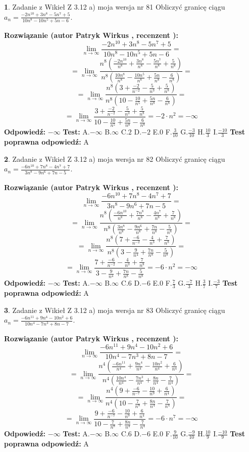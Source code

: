 \documentclass[12pt, a4paper]{article}
\theoremstyle{definition} %
\newtheorem{zad}{}
\newcommand{\zadStart}[1]{\begin{zad}#1\newline}
\newcommand{\zadStop}{\end{zad}}
\newcommand{\rozwStart}[2]{\noindent \textbf{Rozwiązanie (autor #1 , recenzent #2): }\newline}
\newcommand{\rozwStop}{\newline}
\newcommand{\odpStart}{\noindent \textbf{Odpowiedź:}\newline}
\newcommand{\odpStop}{\newline}
\newcommand{\testStart}{\noindent \textbf{Test:}\newline}
\newcommand{\testStop}{\newline}
\newcommand{\kluczStart}{\noindent \textbf{Test poprawna odpowiedź:}\newline}
\newcommand{\kluczStop}{\newline}
\begin{document}
\zadStart{Zadanie z Wikieł Z 3.12 a) moja wersja nr 81}
Obliczyć granicę ciągu $a_{n}=\frac{-2n^{10}+3n^{8}-5n^{7}+5}{10n^{8}-10n^{5}+5n-6}$.
\zadStop
\rozwStart{Patryk Wirkus}{}
$$\lim\limits_{n\to\infty}\frac{-2n^{10}+3n^{8}-5n^{7}+5}{10n^{8}-10n^{5}+5n-6}=$$
$$=\lim\limits_{n\to\infty}\frac{n^{8}\left(\frac{-2n^{10}}{n^{8}}+\frac{3n^{8}}{n^{8}}-\frac{5n^{7}}{n^{8}}+\frac{5}{n^{8}}\right)}{n^{8}\left(\frac{10n^{8}}{n^{8}}-\frac{10n^{5}}{n^{8}}+\frac{5n}{n^{8}}-\frac{6}{n^{8}}\right)}=$$
$$=\lim\limits_{n\to\infty}\frac{n^{8}\left(3+\frac{-2}{n^{-2}}-\frac{5}{n^{3}}+\frac{5}{n^{8}}\right)}
{n^{8}\left(10-\frac{10}{n^{5}}+\frac{5n}{n^{8}}-\frac{6}{n^{8}}\right)}=$$
$$=\lim\limits_{n\to\infty}\frac{3+\frac{-2}{n^{-2}}-\frac{5}{n^{3}}+\frac{5}{n^{8}}}{10-\frac{10}{n^{5}}+\frac{5n}{n^{8}}-\frac{6}{n^{8}}}=-2\cdot n^{2} = -\infty$$
\rozwStop
\odpStart
$-\infty$
\odpStop
\testStart
A.$-\infty$
B.$\infty$
C.$2$
D.$-2$
E.$0$
F.$\frac{3}{10}$
G.$\frac{-3}{10}$
H.$\frac{10}{3}$
I.$\frac{-10}{3}$
\testStop
\kluczStart
A
\kluczStop



\zadStart{Zadanie z Wikieł Z 3.12 a) moja wersja nr 82}
Obliczyć granicę ciągu $a_{n}=\frac{-6n^{10}+7n^{8}-4n^{7}+7}{3n^{8}-9n^{6}+7n-5}$.
\zadStop
\rozwStart{Patryk Wirkus}{}
$$\lim\limits_{n\to\infty}\frac{-6n^{10}+7n^{8}-4n^{7}+7}{3n^{8}-9n^{6}+7n-5}=$$
$$=\lim\limits_{n\to\infty}\frac{n^{8}\left(\frac{-6n^{10}}{n^{8}}+\frac{7n^{8}}{n^{8}}-\frac{4n^{7}}{n^{8}}+\frac{7}{n^{8}}\right)}{n^{8}\left(\frac{3n^{8}}{n^{8}}-\frac{9n^{6}}{n^{8}}+\frac{7n}{n^{8}}-\frac{5}{n^{8}}\right)}=$$
$$=\lim\limits_{n\to\infty}\frac{n^{8}\left(7+\frac{-6}{n^{-2}}-\frac{4}{n^{3}}+\frac{7}{n^{8}}\right)}
{n^{8}\left(3-\frac{9}{n^{4}}+\frac{7n}{n^{8}}-\frac{5}{n^{8}}\right)}=$$
$$=\lim\limits_{n\to\infty}\frac{7+\frac{-6}{n^{-2}}-\frac{4}{n^{3}}+\frac{7}{n^{8}}}{3-\frac{9}{n^{4}}+\frac{7n}{n^{8}}-\frac{5}{n^{8}}}=-6\cdot n^{2} = -\infty$$
\rozwStop
\odpStart
$-\infty$
\odpStop
\testStart
A.$-\infty$
B.$\infty$
C.$6$
D.$-6$
E.$0$
F.$\frac{7}{3}$
G.$\frac{-7}{3}$
H.$\frac{3}{7}$
I.$\frac{-3}{7}$
\testStop
\kluczStart
A
\kluczStop



\zadStart{Zadanie z Wikieł Z 3.12 a) moja wersja nr 83}
Obliczyć granicę ciągu $a_{n}=\frac{-6n^{11}+9n^{4}-10n^{2}+6}{10n^{4}-7n^{3}+8n-7}$.
\zadStop
\rozwStart{Patryk Wirkus}{}
$$\lim\limits_{n\to\infty}\frac{-6n^{11}+9n^{4}-10n^{2}+6}{10n^{4}-7n^{3}+8n-7}=$$
$$=\lim\limits_{n\to\infty}\frac{n^{4}\left(\frac{-6n^{11}}{n^{4}}+\frac{9n^{4}}{n^{4}}-\frac{10n^{2}}{n^{4}}+\frac{6}{n^{4}}\right)}{n^{4}\left(\frac{10n^{4}}{n^{4}}-\frac{7n^{3}}{n^{4}}+\frac{8n}{n^{4}}-\frac{7}{n^{4}}\right)}=$$
$$=\lim\limits_{n\to\infty}\frac{n^{4}\left(9+\frac{-6}{n^{-7}}-\frac{10}{n^{9}}+\frac{6}{n^{4}}\right)}
{n^{4}\left(10-\frac{7}{n^{8}}+\frac{8n}{n^{4}}-\frac{7}{n^{4}}\right)}=$$
$$=\lim\limits_{n\to\infty}\frac{9+\frac{-6}{n^{-7}}-\frac{10}{n^{9}}+\frac{6}{n^{4}}}{10-\frac{7}{n^{8}}+\frac{8n}{n^{4}}-\frac{7}{n^{4}}}=-6\cdot n^{7} = -\infty$$
\rozwStop
\odpStart
$-\infty$
\odpStop
\testStart
A.$-\infty$
B.$\infty$
C.$6$
D.$-6$
E.$0$
F.$\frac{9}{10}$
G.$\frac{-9}{10}$
H.$\frac{10}{9}$
I.$\frac{-10}{9}$
\testStop
\kluczStart
A
\kluczStop
\end{document}

